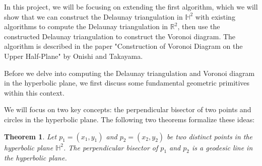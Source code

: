 \documentclass[minted, draw]{hebdomon}
\newcommand{\R}{{\mathbb{R} }}
\newcommand{\HH}{{\mathbb{H} }}
\newtheorem{theorem}{Theorem}
\begin{document}
In this project, we will be focusing on extending the first algorithm, which we will show that we can construct the Delaunay triangulation in $\HH^2$ with existing algorithms to compute the Delaunay triangulation in $\R^2$, then use the constructed Delaunay triangulation to construct the Voronoi diagram. The algorithm is described in the paper "Construction of Voronoi Diagram on the Upper Half-Plane" by Onishi and Takayama.



Before we delve into computing the Delaunay triangulation and Voronoi diagram in the hyperbolic plane, we first discuss some fundamental geometric primitives within this context.

We will focus on two key concepts: the perpendicular bisector of two points and circles in the hyperbolic plane. The following two theorems formalize these ideas:

\begin{theorem}
    Let $p_1 = (x_1, y_1)$ and $p_2 = (x_2, y_2)$ be two distinct points in the hyperbolic plane $\mathbb{H}^2$. The perpendicular bisector of $p_1$ and $p_2$ is a geodesic line in the hyperbolic plane.
\end{theorem}
\end{document}
